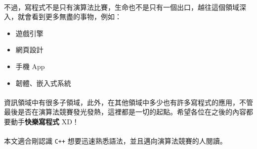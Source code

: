 \documentclass[12pt,a4paper,oneside]{article}
\begin{document}
\begin{CJK}{UTF8}{bkai}
\paragraph{}不過，寫程式不是只有演算法比賽，生命也不是只有一個出口，越往這個領域深入，就會看到更多無盡的事物，例如：
\begin{itemize}
\item 遊戲引擎
\item 網頁設計
\item 手機 App
\item 韌體、嵌入式系統
\end{itemize}

\paragraph{}資訊領域中有很多子領域，此外，在其他領域中多少也有許多寫程式的應用，不管最後是否在演算法競賽發光發熱，這裡都是一切的起點。希望各位在之後的內容都要動手\textbf{快樂寫程式} XD！

\paragraph{}本文適合剛認識 \texttt{C++} 想要迅速熟悉語法，並且邁向演算法競賽的人閱讀。

\ifx \allfiles \undefined

\printindex

\clearpage
\end{CJK}
\end{document}
